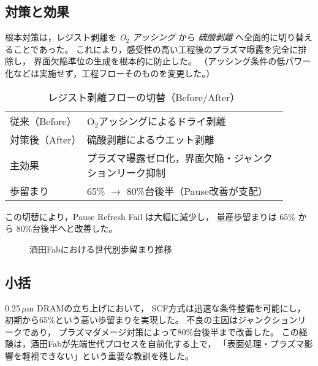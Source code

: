 \documentclass[conference]{IEEEtran}
\begin{document}
\subsection{対策と効果}
根本対策は，レジスト剥離を \emph{O$_2$ アッシング} から
\emph{硫酸剥離} へ全面的に切り替えることであった。
これにより，感受性の高い工程後のプラズマ曝露を完全に排除し，
界面欠陥準位の生成を根本的に防止した。
（アッシング条件の低パワー化などは実施せず，工程フローそのものを変更した。）

\begin{table}[t]
  \centering
  \caption{レジスト剥離フローの切替（Before/After）}
  \begin{tabular}{p{0.25\linewidth} p{0.65\linewidth}}
    \toprule
    従来（Before） & O$_2$アッシングによるドライ剥離 \\
    対策後（After） & 硫酸剥離によるウエット剥離 \\
    主効果 & プラズマ曝露ゼロ化，界面欠陥・ジャンクションリーク抑制 \\
    歩留まり & 65\% $\rightarrow$ 80\%台後半（Pause改善が支配） \\
    \bottomrule
  \end{tabular}
\end{table}

この切替により，Pause Refresh Fail は大幅に減少し，
量産歩留まりは 65\% から 80\%台後半へと改善した。

\begin{figure}[t]
\centering
{}
\caption{酒田Fabにおける世代別歩留まり推移}
\label{fig:yield_trend}
\end{figure}

\subsection{小括}
0.25\,$\mu$m DRAMの立ち上げにおいて，
SCF方式は迅速な条件整備を可能にし，
初期から65\%という高い歩留まりを実現した。
不良の主因はジャンクションリークであり，
プラズマダメージ対策によって80\%台後半まで改善した。
この経験は，酒田Fabが先端世代プロセスを自前化する上で，
「表面処理・プラズマ影響を軽視できない」という重要な教訓を残した。
\end{document}
